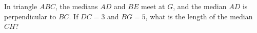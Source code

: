 In triangle $ABC$, the medians $AD$ and $BE$ meet at $G$, and the median $AD$ is perpendicular to $BC$. If $DC=3$ and $BG=5$, what is the length of the median $CH$?
